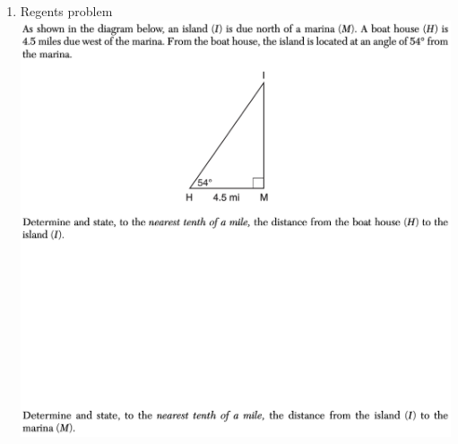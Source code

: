 \documentclass[12pt, twoside]{article}
\begin{document}
\begin{enumerate}
\newpage
\item Regents problem \\
\includegraphics[width=16cm]{../graphics/marina.png}


\end{enumerate}
\end{document}
